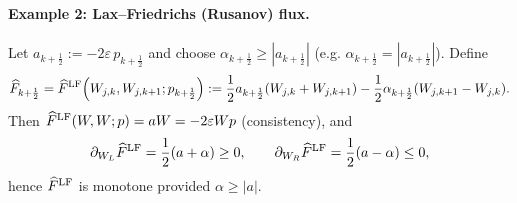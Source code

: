\documentclass[11pt, dina4, amsfont12]{article}
\begin{document}
\paragraph{Example 2: Lax--Friedrichs (Rusanov) flux.}
Let $a_{k+\frac12}:=-2\varepsilon\,p_{k+\frac12}$ and choose
$\alpha_{k+\frac12}\ge |a_{k+\frac12}|$ (e.g. $\alpha_{k+\frac12}=|a_{k+\frac12}|$).
Define
\begin{equation}\label{eq:flux_lf}
\widehat F_{k+\frac12}
=\widehat F^{\rm LF}\!\left(W_{j,k},W_{j,k+1};p_{k+\frac12}\right)
:=\frac12 a_{k+\frac12}(W_{j,k}+W_{j,k+1})
-\frac12 \alpha_{k+\frac12}(W_{j,k+1}-W_{j,k}).
\end{equation}
Then $\widehat F^{\rm LF}(W,W;p)=aW=-2\varepsilon W p$ (consistency), and
\[
\partial_{W_L}\widehat F^{\rm LF}=\frac12(a+\alpha)\ge0,\qquad
\partial_{W_R}\widehat F^{\rm LF}=\frac12(a-\alpha)\le0,
\]
hence $\widehat F^{\rm LF}$ is monotone provided $\alpha\ge|a|$.
\end{document}
